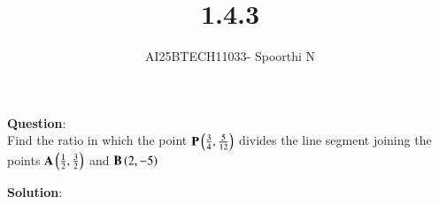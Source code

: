 \documentclass[journal,12pt,onecolumn]{IEEEtran}
\begin{document}
\title{1.4.3}
\author{AI25BTECH11033- Spoorthi N}
{\let\newpage\relax\maketitle}

\textbf{Question}:\\
\noindent Find the ratio in which the point $\Vec{P}\brak{\frac{3}{4},\frac{5}{12}} $ divides the line segment joining the points $\mathbf{A}\left(\frac{1}{2},\frac{3}{2}\right)$ and $\mathbf{B}\left(2,-5\right)$

\textbf{Solution}:
\end{document}
